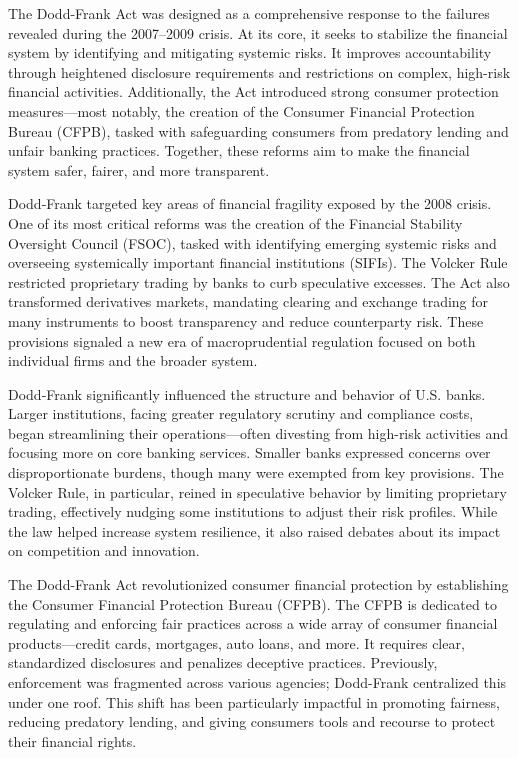The Dodd-Frank Act was designed as a comprehensive response to the failures revealed during the 2007–2009 crisis. At its core, it seeks to stabilize the financial system by identifying and mitigating systemic risks. It improves accountability through heightened disclosure requirements and restrictions on complex, high-risk financial activities. Additionally, the Act introduced strong consumer protection measures—most notably, the creation of the Consumer Financial Protection Bureau (CFPB), tasked with safeguarding consumers from predatory lending and unfair banking practices. Together, these reforms aim to make the financial system safer, fairer, and more transparent.

Dodd-Frank targeted key areas of financial fragility exposed by the 2008 crisis. One of its most critical reforms was the creation of the Financial Stability Oversight Council (FSOC), tasked with identifying emerging systemic risks and overseeing systemically important financial institutions (SIFIs). The Volcker Rule restricted proprietary trading by banks to curb speculative excesses. The Act also transformed derivatives markets, mandating clearing and exchange trading for many instruments to boost transparency and reduce counterparty risk. These provisions signaled a new era of macroprudential regulation focused on both individual firms and the broader system.

Dodd-Frank significantly influenced the structure and behavior of U.S. banks. Larger institutions, facing greater regulatory scrutiny and compliance costs, began streamlining their operations—often divesting from high-risk activities and focusing more on core banking services. Smaller banks expressed concerns over disproportionate burdens, though many were exempted from key provisions. The Volcker Rule, in particular, reined in speculative behavior by limiting proprietary trading, effectively nudging some institutions to adjust their risk profiles. While the law helped increase system resilience, it also raised debates about its impact on competition and innovation.

The Dodd-Frank Act revolutionized consumer financial protection by establishing the Consumer Financial Protection Bureau (CFPB). The CFPB is dedicated to regulating and enforcing fair practices across a wide array of consumer financial products—credit cards, mortgages, auto loans, and more. It requires clear, standardized disclosures and penalizes deceptive practices. Previously, enforcement was fragmented across various agencies; Dodd-Frank centralized this under one roof. This shift has been particularly impactful in promoting fairness, reducing predatory lending, and giving consumers tools and recourse to protect their financial rights.

